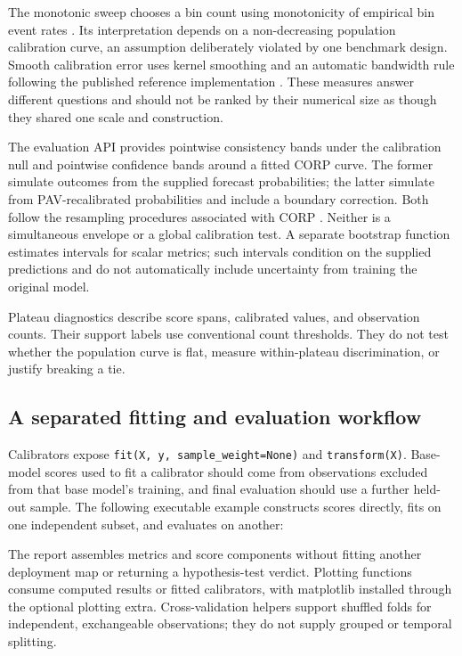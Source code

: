 \documentclass[11pt]{article}
\begin{document}
The monotonic sweep chooses a bin count using monotonicity of empirical bin event rates \citep{roelofs2022ece}. Its interpretation depends on a non-decreasing population calibration curve, an assumption deliberately violated by one benchmark design. Smooth calibration error uses kernel smoothing and an automatic bandwidth rule following the published reference implementation \citep{blasiok2024smooth}. These measures answer different questions and should not be ranked by their numerical size as though they shared one scale and construction.

The evaluation API provides pointwise consistency bands under the calibration null and pointwise confidence bands around a fitted CORP curve. The former simulate outcomes from the supplied forecast probabilities; the latter simulate from PAV-recalibrated probabilities and include a boundary correction. Both follow the resampling procedures associated with CORP \citep{dimitriadis2021stable}. Neither is a simultaneous envelope or a global calibration test. A separate bootstrap function estimates intervals for scalar metrics; such intervals condition on the supplied predictions and do not automatically include uncertainty from training the original model.

Plateau diagnostics describe score spans, calibrated values, and observation counts. Their support labels use conventional count thresholds. They do not test whether the population curve is flat, measure within-plateau discrimination, or justify breaking a tie.

\subsection{A separated fitting and evaluation workflow}

Calibrators expose \texttt{fit(X, y, sample\_weight=None)} and \texttt{transform(X)}. Base-model scores used to fit a calibrator should come from observations excluded from that base model's training, and final evaluation should use a further held-out sample. The following executable example constructs scores directly, fits on one independent subset, and evaluates on another:

The report assembles metrics and score components without fitting another deployment map or returning a hypothesis-test verdict. Plotting functions consume computed results or fitted calibrators, with matplotlib installed through the optional plotting extra. Cross-validation helpers support shuffled folds for independent, exchangeable observations; they do not supply grouped or temporal splitting.
\end{document}
